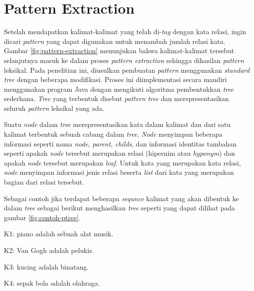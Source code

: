 %
\section{Pattern Extraction}
Setelah mendapatkan kalimat-kalimat yang telah di-\textit{tag} dengan kata relasi, ingin dicari \textit{pattern} yang dapat digunakan untuk menambah jumlah relasi kata. Gambar \ref{fig:pattern-extraction} menunjukan bahwa kalimat-kalimat tersebut selanjutnya masuk ke dalam proses \textit{pattern extraction} sehingga dihasilan \textit{pattern} leksikal. Pada penelitian ini, diusulkan pembuatan \textit{pattern} menggunakan \textit{standard tree} dengan beberapa modifikasi. Proses ini diimplementasi secara mandiri menggunakan program Java dengan mengikuti algoritma pembentukkan \textit{tree} sederhana. \textit{Tree} yang terbentuk disebut \textit{pattern tree} dan merepresentasikan seluruh \textit{pattern} leksikal yang ada.

Suatu \textit{node} dalam \textit{tree} merepresentasikan kata dalam kalimat dan dari satu kalimat terbentuk sebuah cabang dalam \textit{tree}. \textit{Node} menyimpan beberapa informasi seperti nama \textit{\textit{node}}, \textit{parent}, \textit{childs}, dan informasi identitas tambahan seperti apakah \textit{\textit{node}} tersebut merupakan relasi (hipernim atau \textit{hyponym}) dan apakah \textit{\textit{node}} tersebut merupakan \textit{leaf}. Untuk kata yang merupakan kata relasi, \textit{\textit{node}} menyimpan informasi jenis relasi beserta \textit{list} dari kata yang merupakan bagian dari relasi tersebut. 

Sebagai contoh jika terdapat beberapa \textit{sequnce} kalimat yang akan dibentuk ke dalam \textit{tree} sebagai berikut menghasilkan \textit{tree} seperti yang dapat dilihat pada gambar \ref{fig:contoh-ptree}.

K1: {\tagHyponym}piano{\tagHyponym} adalah sebuah {\tagHypernym}alat musik{\tagHypernym}.

K2: {\tagHyponym}Van Gogh{\tagHyponym} adalah {\tagHypernym} pelukis{\tagHypernym}.

K3: {\tagHyponym}kucing{\tagHyponym} adalah {\tagHypernym}binatang{\tagHypernym}.

K4: {\tagHyponym}sepak bola{\tagHyponym} adalah {\tagHypernym} olahraga{\tagHypernym}.

